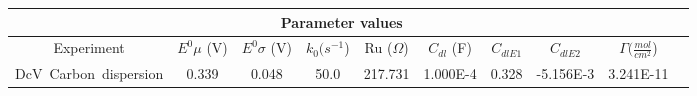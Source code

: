 \documentclass[preview]{standalone}
\begin{document}
\begin{center}
\begin{tabular}{|c|c|c|c|c|c|c|c|c|c|}
\hline
\multicolumn{9}{|c|}{Parameter values}\\
\hline
Experiment & $E^0 \mu$ (V) & $E^0 \sigma$ (V) & $k_0 (s^{-1}$) & Ru ($\Omega$) & $C_{dl}$ (F) & $C_{dlE1}$ & $C_{dlE2}$ & $\Gamma (\frac{mol}{cm^{2}}$)\\
\hline
DcV\ Carbon\ dispersion & 0.339 & 0.048 & 50.0 & 217.731 & 1.000E-4 & 0.328 & -5.156E-3 & 3.241E-11\\
\hline
\end{tabular}
\end{center}
\end{document}
